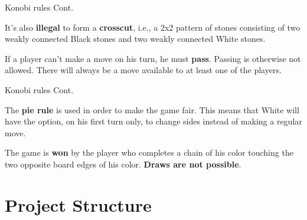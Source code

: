 \documentclass{beamer}
\begin{document}
  \begin{frame}{Konobi rules Cont.}

    It's also \textbf{illegal} to form a \textbf{crosscut}, i.e., a 2x2 pattern of stones consisting of two weakly connected Black stones and two weakly connected White stones.

    \vspace{1em}

    \begin{centering}


    \end{centering}\pause

    \vspace{1em}

    If a player can't make a move on his turn, he must \textbf{pass}. Passing is otherwise not allowed. There will always be a move available to at least one of the players.

  \end{frame}


  \begin{frame}{Konobi rules Cont.}

    The \textbf{pie rule} is used in order to make the game fair. This means that White will have the option, on his first turn only, to change sides instead of making a regular move.\pause

    \vspace{3em}

    The game is \textbf{won} by the player who completes a chain of his color touching the two opposite board edges of his color. \textbf{Draws are not possible}.

  \end{frame}

\section{Project Structure}
\end{document}
